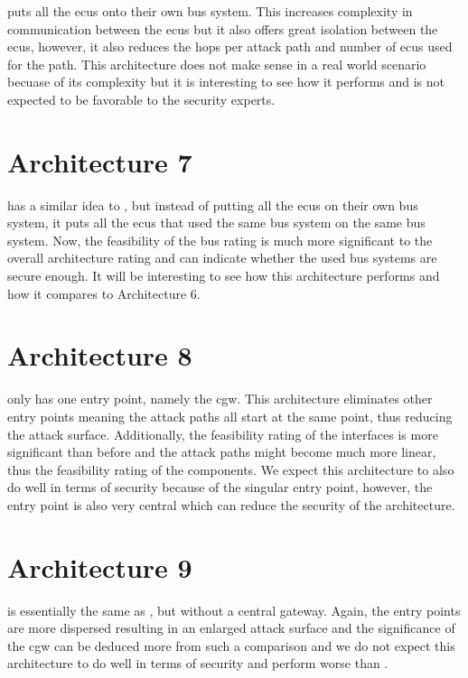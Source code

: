  puts all the \acrshort{ecu}s onto their own bus system. 
This increases complexity in communication between the \acrshort{ecu}s but it also offers great isolation between the \acrshort{ecu}s, 
however, it also reduces the hops per attack path and number of \acrshort{ecu}s used for the path.
This architecture does not make sense in a real world scenario becuase of its complexity but it is interesting to see how it performs
and is not expected to be favorable to the security experts.

\section{Architecture 7}
\label{subsec:arch7}

 has a similar idea to ,
but instead of putting all the \acrshort{ecu}s on their own bus system, it puts all the \acrshort{ecu}s that used the same bus system on the same bus system. 
Now, the feasibility of the bus rating is much more significant to the overall architecture rating and can indicate whether the used bus systems are secure enough.
It will be interesting to see how this architecture performs and how it compares to Architecture 6.

\section{Architecture 8}
\label{subsec:arch8}

 only has one entry point, namely the \acrshort{cgw}.
This architecture eliminates other entry points meaning the attack paths all start at the same point, thus reducing the attack surface. 
Additionally, the feasibility rating of the interfaces is more significant than before and the attack paths might become much more linear, 
thus the feasibility rating of the components.
We expect this architecture to also do well in terms of security because of the singular entry point, 
however, the entry point is also very central which can reduce the security of the architecture.

\section{Architecture 9}
\label{subsec:arch9}

 is essentially the same as ,
but without a central gateway. Again, the entry points are more dispersed resulting in an enlarged attack surface 
and the significance of the \acrshort{cgw} can be deduced more from such a comparison 
and we do not expect this architecture to do well in terms of security and perform worse than . 

